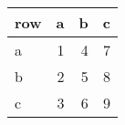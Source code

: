\begin{tabular}{lrrr}
  \toprule
 row & a & b & c \\ 
  \midrule
  a &   1 &   4 &   7 \\ 
  b &   2 &   5 &   8 \\ 
  c &   3 &   6 &   9 \\ 
   \bottomrule
\end{tabular}

